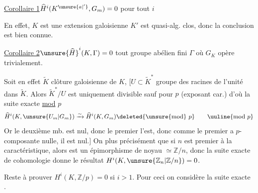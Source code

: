 \uline{Corollaire 1}\quad $\widehat H^i(K^{\unsure{a|'}},G_m)=0$ pour tout $i$

En effet, $K$ est une extension galoisienne  $K'$ est quasi-alg. clos, donc  la conclusion est bien connue.

\uline{Corollaire 2}\quad $\unsure{\widehat H}^i(K,\Gamma)=0$   tout groupe abélien fini $\Gamma$ où $G_K$ opère trivialement.

Soit en effet $\widetilde K$   clôture galoisienne de $K$,
$[U\subset\widetilde K^*$  groupe des racines de l'unité dans $\widetilde K$.
Alors $\widetilde K^*/U$ est uniquement divisible sauf pour $p$ (exposant car.) d'où la suite exacte \uline{mod} $p$
\[
\widehat H^i(K,\unsure{U_m|G_m})\xrightarrow{\sim}\widehat H^i(K,G_m)\deleted{\text{\unsure{mod}}\ p}\qquad\uuline{\text{mod }p}
\]
Or le  deuxième mb. est nul, donc le premier l'est, donc comme le premier  a $p$-composante nulle, il est nul.$]$
On   plus précisément que si $n$ est premier à la caractéristique, alors
est un épimorphisme de  noyau $\simeq\mathbb Z/n$, donc la suite exacte de cohomologie donne le résultat $H^i(K,\unsure{\mathbb Z_n|\mathbb Z/n})=0$.

Reste à prouver $H^i(K,\mathbb Z/p)=0$ si $i>1$. Pour ceci
on considère la suite exacte
.


